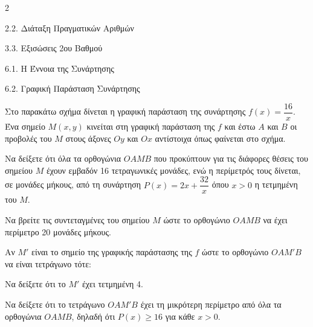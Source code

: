 \begin{ylh}{2}
    \item 2.2. Διάταξη Πραγματικών Αριθμών
    \item 3.3. Εξισώσεις 2ου Βαθμού
    \item 6.1. Η Έννοια της Συνάρτησης
    \item 6.2. Γραφική Παράσταση Συνάρτησης
\end{ylh}

Στο παρακάτω σχήμα δίνεται η γραφική παράσταση της συνάρτησης $f(x) = \dfrac{16}{x}$. Ένα σημείο $M(x,y)$ κινείται στη γραφική παράσταση της $f$ και έστω $A$ και $B$ οι προβολές του $M$ στους άξονες $Oy$ και $Ox$ αντίστοιχα όπως φαίνεται στο σχήμα.

\begin{center}
\end{center}
\begin{alist}
\item Να δείξετε ότι όλα τα ορθογώνια $OAMB$ που προκύπτουν για τις διάφορες θέσεις του σημείου $M$ έχουν εμβαδόν 16 τετραγωνικές μονάδες, ενώ η περίμετρός τους δίνεται, σε μονάδες μήκους, από τη συνάρτηση $P(x) = 2x + \dfrac{32}{x}$ όπου $x > 0$ η τετμημένη του $M$.
\item Να βρείτε τις συντεταγμένες του σημείου $M$ ώστε το ορθογώνιο $OAMB$ να έχει περίμετρο 20 μονάδες μήκους.
\item Αν $M'$ είναι το σημείο της γραφικής παράστασης της $f$ ώστε το ορθογώνιο $OAM'B$ να είναι τετράγωνο τότε:
\begin{rlist}
\item Να δείξετε ότι το $M'$ έχει τετμημένη 4.
\item Να δείξετε ότι το τετράγωνο $OAM'B$ έχει τη μικρότερη περίμετρο από όλα τα ορθογώνια $OAMB$, δηλαδή ότι $P(x) \geq 16$ για κάθε $x > 0$.
\end{rlist}
\end{alist}

